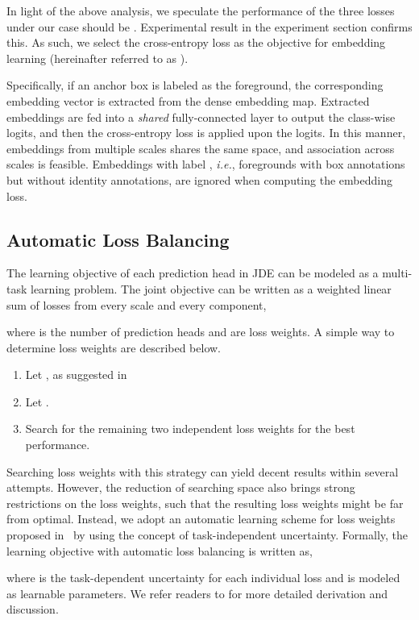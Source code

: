 \documentclass[runningheads]{llncs}
\def\ie{\textit{i.e.}}
\begin{document}
In light of the above analysis, we speculate the performance of the three losses under our case should be . Experimental result in the experiment section confirms this. As such, we select the cross-entropy loss as the objective for embedding learning (hereinafter referred to as ).

Specifically, if an anchor box is labeled as the foreground, the corresponding embedding vector is extracted from the dense embedding map. Extracted embeddings are fed into a \emph{shared} fully-connected layer to output the class-wise logits, and then the  cross-entropy loss is applied upon the logits. In this manner, embeddings from multiple scales shares the same space, and association across scales is feasible. Embeddings with label , \ie, foregrounds with box annotations but without identity annotations, are ignored when computing the embedding loss. 


\subsection{Automatic Loss Balancing}
\label{sec:lossbalancing}
The learning objective of each prediction head in JDE can be modeled as a multi-task learning problem. The joint objective can be written as a weighted linear sum of losses from every scale and every component,

where  is the number of prediction heads and  are loss weights. 
A simple way to determine loss weights are described below.
\begin{enumerate}\item Let , as suggested in~\cite{faster}
    \item Let .
    \item Search for the remaining two independent loss weights for the best performance.
\end{enumerate}
Searching loss weights with this strategy can yield decent results within several attempts. However, the reduction of searching space also brings strong restrictions on the loss weights, such that the resulting loss weights might be far from optimal. 
Instead, we adopt an automatic learning scheme for loss weights proposed in~\cite{uncertainty} by using the concept of task-independent uncertainty. Formally, the learning objective with automatic loss balancing is written as,

where  is the task-dependent uncertainty for each individual loss and is modeled as learnable parameters. We refer readers to \cite{uncertainty} for more detailed derivation and discussion.
\end{document}

